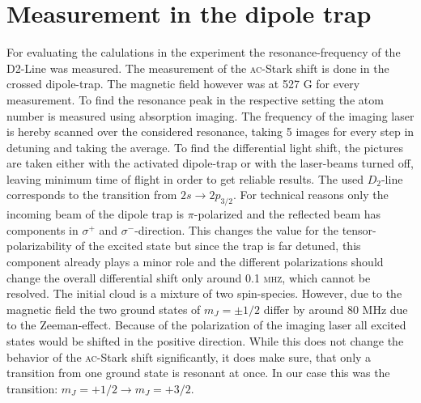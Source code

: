 \chapter{Measurement in the dipole trap}
For evaluating the calulations in the experiment the resonance-frequency of the D2-Line was measured. The measurement of the \textsc{ac}-Stark shift is done in the crossed dipole-trap. The magnetic field however was at 527 G for every measurement. To find the resonance peak in the respective setting the atom number is measured using absorption imaging. The frequency of the imaging laser is hereby scanned over the considered resonance, taking 5 images for every step in detuning and taking the average. To find the differential light shift, the pictures are taken either with the activated dipole-trap or with the laser-beams turned off, leaving minimum time of flight in order to get reliable results. The used $D_2$-line corresponds to the transition from  $2s\rightarrow2p_{3/2}$. For technical reasons only the incoming beam of the dipole trap is $\pi$-polarized and the reflected beam has components in \(\sigma^+\) and \(\sigma^-\)-direction. This changes the value for the tensor-polarizability of the excited state but since the trap is far detuned, this component already plays a minor role and the different polarizations should change the overall differential shift only around 0.1 \textsc{mhz}, which cannot be resolved. The initial cloud is a mixture of two spin-species. However, due to the magnetic field the two ground states of $m_J=\pm 1/2$ differ by around 80 MHz due to the Zeeman-effect. Because of the polarization of the imaging laser all excited states would be shifted in the positive direction. While this does not change the behavior of the \textsc{ac}-Stark shift significantly, it does make sure, that only a transition from one ground state is resonant at once. In our case this was the transition: $m_J=+1/2 \rightarrow m_J=+3/2$. 
